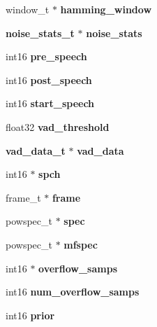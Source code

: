\begin{DoxyCompactItemize}
\item 
window\-\_\-t $\ast$ {\bfseries hamming\-\_\-window}\label{structfe__s_ad47433337a370e452070ffddce87e474}

\item 
{\bf noise\-\_\-stats\-\_\-t} $\ast$ {\bfseries noise\-\_\-stats}\label{structfe__s_a6b1303b8c74a676ca9dcc9adc07033e9}

\item 
int16 {\bfseries pre\-\_\-speech}\label{structfe__s_a2bcaff6bbc8ee6e990a7092bd0d22771}

\item 
int16 {\bfseries post\-\_\-speech}\label{structfe__s_a46c8eab758b1a737ccc5ef4654e42f6c}

\item 
int16 {\bfseries start\-\_\-speech}\label{structfe__s_a93290323d05eb26e0dfe423a9b27063a}

\item 
float32 {\bfseries vad\-\_\-threshold}\label{structfe__s_a8c484564cca88e8aec167fe94bd27891}

\item 
{\bf vad\-\_\-data\-\_\-t} $\ast$ {\bfseries vad\-\_\-data}\label{structfe__s_aaae66e5327a74c4270c8f0decd4d4389}

\item 
int16 $\ast$ {\bfseries spch}\label{structfe__s_a7d49693c1fa1b14bbcd25b87ad97935b}

\item 
frame\-\_\-t $\ast$ {\bfseries frame}\label{structfe__s_a6fe89784eb5d23ee812439f427d33fe6}

\item 
powspec\-\_\-t $\ast$ {\bfseries spec}\label{structfe__s_af455b0ee3f8d81ca84ac88d4ea04e860}

\item 
powspec\-\_\-t $\ast$ {\bfseries mfspec}\label{structfe__s_a87fd448109884fc3d796b926b67697e7}

\item 
int16 $\ast$ {\bfseries overflow\-\_\-samps}\label{structfe__s_a7975216c6a540fa498352736404797b1}

\item 
int16 {\bfseries num\-\_\-overflow\-\_\-samps}\label{structfe__s_ac22fe7c117ef00eb513d7d0771333ddd}

\item 
int16 {\bfseries prior}\label{structfe__s_ae6af635a19dac6426bf882a3fc5b069b}

\end{DoxyCompactItemize}


